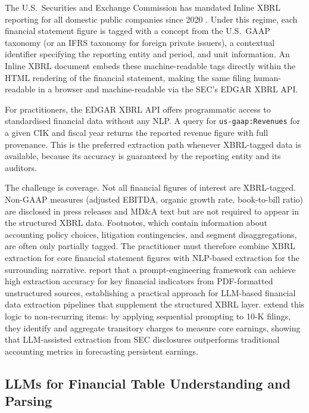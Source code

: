 The U.S.\ Securities and Exchange Commission has mandated Inline XBRL reporting for
all domestic public companies since 2020 \citep{sec2009xbrl}. Under this regime, each
financial statement figure is tagged with a concept from the U.S.\ GAAP taxonomy (or
an IFRS taxonomy for foreign private issuers), a contextual identifier specifying the
reporting entity and period, and unit information. An Inline XBRL document embeds these
machine-readable tags directly within the HTML rendering of the financial statement,
making the same filing human-readable in a browser and machine-readable via the SEC's
EDGAR XBRL API.

For practitioners, the EDGAR XBRL API offers programmatic access to standardised
financial data without any NLP. A query for \texttt{us-gaap:Revenues} for a given CIK
and fiscal year returns the reported revenue figure with full provenance. This is the
preferred extraction path whenever XBRL-tagged data is available, because its accuracy
is guaranteed by the reporting entity and its auditors.

The challenge is coverage. Not all financial figures of interest are XBRL-tagged.
Non-GAAP measures (adjusted EBITDA, organic growth rate, book-to-bill ratio) are
disclosed in press releases and MD\&A text but are not required to appear in the
structured XBRL data. Footnotes, which contain information about accounting policy
choices, litigation contingencies, and segment disaggregations, are often only partially
tagged. The practitioner must therefore combine XBRL extraction for core financial
statement figures with NLP-based extraction for the surrounding narrative.
\citet{LiGao2023} report that a prompt-engineering framework can
achieve high extraction accuracy for key financial indicators from
PDF-formatted unstructured sources, establishing a practical approach
for LLM-based financial data extraction pipelines that supplement the structured
XBRL layer. \citet{ShafferWang2024} extend this logic to non-recurring
items: by applying sequential prompting to 10-K filings, they identify and aggregate
transitory charges to measure core earnings, showing that LLM-assisted extraction
from SEC disclosures outperforms traditional accounting metrics in forecasting
persistent earnings.

\subsection{LLMs for Financial Table Understanding and Parsing}
\label{sec:ch14-llm-table-understanding}

